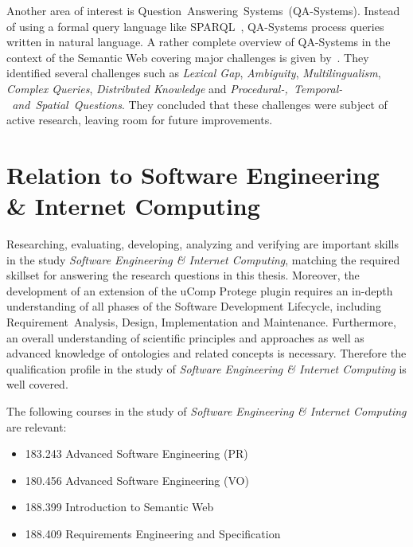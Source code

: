 \documentclass[12pt, notitlepage]{article}
\begin{document}
Another area of interest is Question~Answering~Systems~(QA-Systems). Instead of using a formal query language like SPARQL~\cite{harris2013sparql}, QA-Systems process queries written in natural language. A rather complete overview of QA-Systems in the context of the Semantic Web covering major challenges is given by~\citet{hoffner2016survey}. They identified several challenges such as \emph{Lexical Gap}, \emph{Ambiguity}, \emph{Multilingualism}, \emph{Complex Queries}, \emph{Distributed Knowledge} and \emph{Procedural-,~Temporal-~and~Spatial~Questions}. They concluded that these challenges were subject of active research, leaving room for future improvements. 

\section{Relation to Software Engineering \& Internet Computing}
Researching, evaluating, developing, analyzing and verifying are important skills in the study \emph{Software Engineering \& Internet Computing}, matching the required skillset for answering the research questions in this thesis. Moreover, the development of an extension of the uComp Protege plugin requires an in-depth understanding of all phases of the Software Development Lifecycle, including Requirement~Analysis, Design, Implementation and Maintenance. Furthermore, an overall understanding of scientific principles and approaches as well as advanced knowledge of ontologies and related concepts is necessary. Therefore the qualification profile in the study of \emph{Software Engineering \& Internet Computing} is well covered. 

The following courses in the study of \emph{Software Engineering \& Internet Computing} are relevant:
\begin{itemize}
	\item 183.243 Advanced Software Engineering (PR)
	\item 180.456 Advanced Software Engineering (VO)
	\item 188.399 Introduction to Semantic Web
	\item 188.409 Requirements Engineering and Specification
\end{itemize}

\newpage


\end{document}
